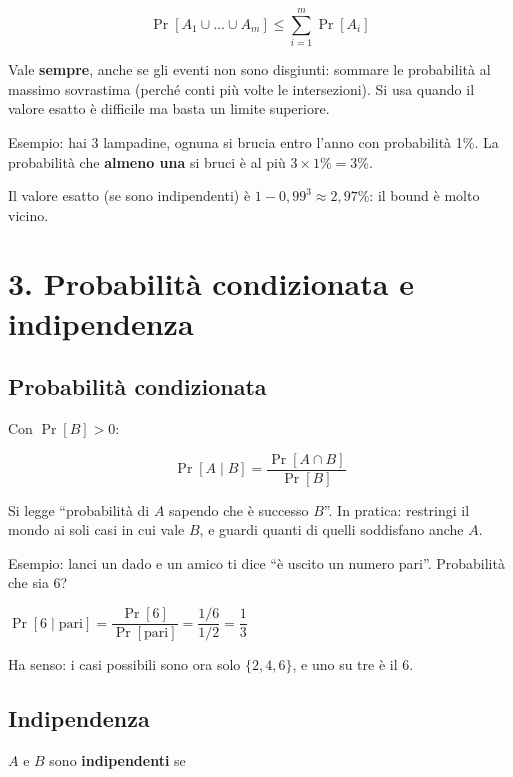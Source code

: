 \[
\Pr[A_1 \cup \dots \cup A_m] \le \sum_{i=1}^{m} \Pr[A_i]
\]

Vale \textbf{sempre}, anche se gli eventi non sono disgiunti: sommare le probabilità al massimo sovrastima (perché conti più volte le intersezioni). Si usa quando il valore esatto è difficile ma basta un limite superiore.

\begin{esempio}

Esempio: hai 3 lampadine, ognuna si brucia entro l'anno con probabilità 1\%. La probabilità che \textbf{almeno una} si bruci è al più \(3 \times 1\% = 3\%\).

Il valore esatto (se sono indipendenti) è \(1 - 0{,}99^3 \approx 2{,}97\%\): il bound è molto vicino.

\end{esempio}

\section{3. Probabilità condizionata e indipendenza}

\subsection{Probabilità condizionata}

Con \(\Pr[B] > 0\):

\[
\Pr[A \mid B] = \frac{\Pr[A \cap B]}{\Pr[B]}
\]

Si legge ``probabilità di \(A\) sapendo che è successo \(B\)''. In pratica: restringi il mondo ai soli casi in cui vale \(B\), e guardi quanti di quelli soddisfano anche \(A\).

\begin{esempio}

Esempio: lanci un dado e un amico ti dice ``è uscito un numero pari''. Probabilità che sia 6?

\(\Pr[6 \mid \text{pari}] = \dfrac{\Pr[6]}{\Pr[\text{pari}]} = \dfrac{1/6}{1/2} = \dfrac{1}{3}\)

Ha senso: i casi possibili sono ora solo \(\{2,4,6\}\), e uno su tre è il 6.

\end{esempio}

\subsection{Indipendenza}

\(A\) e \(B\) sono \textbf{indipendenti} se

